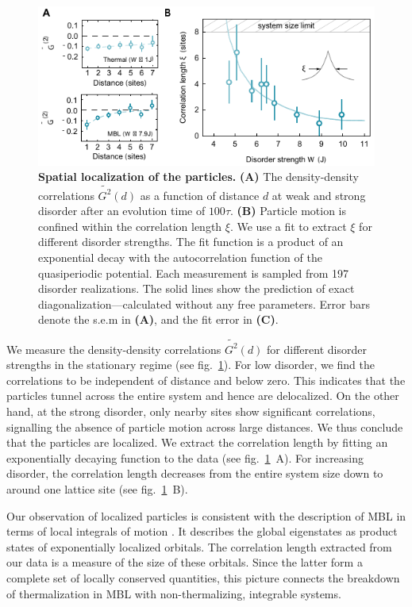 \begin{figure}[t]
	\centering
	\includegraphics{figures/MBL_localization.pdf}
	\caption{{\bf Spatial localization of the particles.} {\bf{(A)}} The density-density correlations $\widetilde{G^{2}}(d)$ as a function of distance $d$ at weak and strong disorder after an evolution time of $100\tau$. {\bf (B)} Particle motion is confined within the correlation length $\xi$. We use a fit to extract $\xi$ for different disorder strengths. The fit function is a product of an exponential decay with the autocorrelation function of the quasiperiodic potential. Each measurement is sampled from 197 disorder realizations. The solid lines show the prediction of exact diagonalization---calculated without any free parameters. Error bars denote the s.e.m in {\bf (A)}, and the fit error in {\bf (C)}.}
	\label{fig:MBL_localization}
\end{figure}

We measure the density-density correlations $\widetilde{G^{2}}(d)$ for different disorder strengths in the stationary regime (see fig.~\ref{fig:MBL_localization}). For low disorder, we find the correlations to be independent of distance and below zero. This indicates that the particles tunnel across the entire system and hence are delocalized. On the other hand, at the strong disorder, only nearby sites show significant correlations, signalling the absence of particle motion across large distances. We thus conclude that the particles are localized. We extract the correlation length by fitting an exponentially decaying function to the data (see fig.~\ref{fig:MBL_localization}~A). For increasing disorder, the correlation length decreases from the entire system size down to around one lattice site (see fig.~\ref{fig:MBL_localization}~B). 

Our observation of localized particles is consistent with the description of MBL in terms of local integrals of motion \cite{Serbyn2013, Serbyn2013b, Huse2014}. It describes the global eigenstates as product states of exponentially localized orbitals. The correlation length extracted from our data is a measure of the size of these orbitals. Since the latter form a complete set of locally conserved quantities, this picture connects the breakdown of thermalization in MBL with non-thermalizing, integrable systems. 

